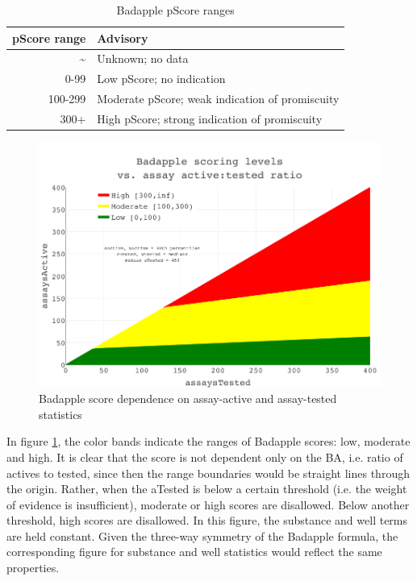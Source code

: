 \begin{table}
\caption{Badapple pScore ranges}
\begin{center}
\begin{tabular}{r|l} 
\hline
\textbf{pScore range} & \textbf{Advisory}\\
\hline
\~{} & Unknown; no data\\
0-99 & Low pScore; no indication\\
100-299 & Moderate pScore; weak indication of promiscuity\\
300+ & High pScore; strong indication of promiscuity\\
\hline
\end{tabular}
\end{center}
\label{table:ba_ranges}
\end{table}

\begin{figure}
	\includegraphics[width=\textwidth]{figures/badapple/badapple_formula.png}
	\caption{Badapple score dependence on assay-active and assay-tested statistics}
	\label{fig:BA_01}
\end{figure}

In figure \ref{fig:BA_01}, the color bands indicate the ranges of Badapple scores: low, moderate and high. It is clear that the score is not dependent only on the BA, i.e. ratio of actives to tested, since then the range boundaries would be straight lines through the origin. Rather, when the aTested is below a certain threshold (i.e. the weight of evidence is insufficient), moderate or high scores are disallowed. Below another threshold, high scores are disallowed. In this figure, the substance and well terms are held constant. Given the three-way symmetry of the Badapple formula, the corresponding figure for substance and well statistics would reflect the same properties.


